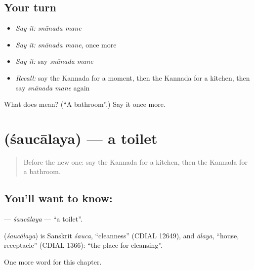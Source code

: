 \subsection*{Your turn}
\begin{itemize}
\raggedright
  \item \emph{Say it:} \emph{snānada mane}
  \item \emph{Say it:} \emph{snānada mane}, once more
  \item \emph{Say it:} say \emph{snānada mane}
  \item \emph{Recall:} say the Kannada for a moment, then the Kannada for a kitchen, then say \emph{snānada mane} again
\end{itemize}

\begin{tcolorbox}[breakable,colback=teal!4,colframe=teal!35!black,title={Before you move on}]
What does   mean? (\textquotedblleft{}A bathroom\textquotedblright{}.) Say it once more.
\end{tcolorbox}
\section[\texorpdfstring{\kn{ಶೌಚಾಲಯ} (śaucālaya)}{ಶೌಚಾಲಯ (śaucālaya)}]{ (śaucālaya) — a toilet}

\label{lesson:KA-C173-saucalaya}



\begin{quote}
Before the new one: say the Kannada for a kitchen, then the Kannada for a bathroom.
\end{quote}

\subsection*{You'll want to know: }
\textbf{} — \emph{śaucālaya} — \textquotedblleft{}a toilet\textquotedblright{}.

\begin{cousinweb}
\textbf{} (\emph{śaucālaya}) is Sanskrit \emph{śauca}, \textquotedblleft{}cleanness\textquotedblright{} (CDIAL 12649), and \emph{ālaya}, \textquotedblleft{}house, receptacle\textquotedblright{} (CDIAL 1366): \textquotedblleft{}the place for cleansing\textquotedblright{}.
\end{cousinweb}

\begin{grammarlens}[title={What you've built}]
One more word for this chapter.
\end{grammarlens}

